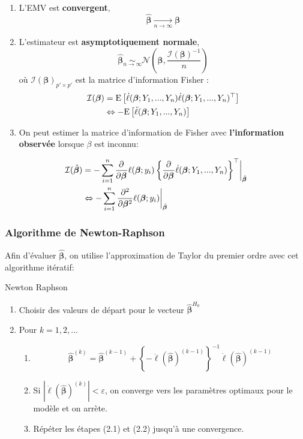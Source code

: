 \documentclass[10pt, french]{article}
\begin{document}
\begin{multicols*}{3}
\begin{enumerate}[label=\faAngleRight]
	\item	L'EMV est \textbf{convergent},
	\[
		\hat{\bm{\beta}} \underset{n \to \infty}{\longrightarrow} \bm{\beta} 
	\]
	
	\item	L'estimateur est \textbf{asymptotiquement normale},
	\[  
		\hat{\bm{\beta}} \underset{n \to \infty}{\sim} \mathcal{N} \left( \bm{\beta}, \frac{\mathcal{I}(\bm{\beta})^{-1}}{n} \right)   
	\]
	où $\mathcal{I}(\bm{\beta})_{p' \times p'}$ est la matrice d'information Fisher : 
	\begin{align*}
		\mathcal{I}(\bm{\beta}) 
			&=	\esp{\dot{\ell}(\bm{\beta} ; Y_1, ..., Y_n) \dot{\ell}(\bm{\beta} ; Y_1, ..., Y_n)^{\top} } \\
			&\Leftrightarrow 	-\esp{\ddot{\ell}(\bm{\beta} ; Y_1, ..., Y_n)} 
	\end{align*}
	
	\item	On peut estimer la matrice d'information de Fisher avec \textbf{l'information observée} lorsque $\beta$ est inconnu:
\end{enumerate}
\begin{align*}
	\mathcal{I}(\hat{\bm{\beta}}) 
		&=	-\sum_{i = 1}^{n} \deriv{\bm{\beta}} \ell(\bm{\beta} ; y_i) \left\{\deriv{\bm{\beta}}\dot{\ell}(\bm{\beta} ; Y_1, ..., Y_n)\right\}^{\top} \eval_{\hat{\bm{\beta}}} \\
		&\Leftrightarrow		-\sum_{i = 1}^{n} \deriv[2]{\bm{\beta}} \ell(\bm{\beta} ; y_i)  \eval_{\hat{\bm{\beta}}} 
	\end{align*}

\subsubsection*{Algorithme de Newton-Raphson}
Afin d'évaluer $\hat{\bm{\beta}}$, on utilise l'approximation de Taylor du premier ordre avec cet algorithme itératif:

\begin{algo}{Newton Raphson}
\begin{enumerate}[label = (\arabic*)]
	\item	Choisir des valeurs de départ pour le vecteur $\hat{\bm{\beta}}^{H_0}$
	\item	Pour $k = 1, 2, ...$
	\begin{enumerate}[label = (2.\arabic*)]
		\item	
		\begin{equation*}
		\hat{\bm{\beta}}^{(k)} 
			= 	\hat{\bm{\beta}}^{(k-1)} +  
				\left \{ - \ddot{\ell}(\hat{\bm{\beta}})^{(k-1)} \right \}^{-1} 
				\dot{\ell}(\hat{\bm{\beta}})^{(k-1)}
		\end{equation*}
		\item	Si $|\dot{\ell}(\hat{\bm{\beta}})^{(k)}| < \varepsilon $, on converge vers les paramètres optimaux pour le modèle et on arrète.
		\item	Répéter les étapes (2.1) et (2.2) jusqu'à une convergence.
\end{enumerate}
\end{enumerate}
\end{algo}


\end{multicols*}
\end{document}
